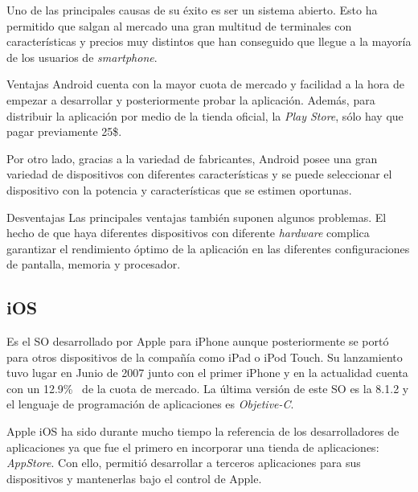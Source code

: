 Uno de las principales causas de su éxito es ser un sistema abierto. Esto ha permitido que salgan al
mercado una gran multitud de terminales con características y precios muy distintos que han
conseguido que llegue a la mayoría de los usuarios de \emph{smartphone}.

\begin{definitionlist}
  \item[Ventajas] Android cuenta con la mayor cuota de mercado y facilidad a la hora de empezar a
    desarrollar y posteriormente probar la aplicación. Además, para distribuir la aplicación por
    medio de la tienda oficial, la \emph{Play Store}, sólo hay que pagar previamente 25\$.

    Por otro lado, gracias a la variedad de fabricantes, Android posee una gran variedad de
    dispositivos con diferentes características y se puede seleccionar el dispositivo con la
    potencia y características que se estimen oportunas.

  \item[Desventajas] Las principales ventajas también suponen algunos problemas. El hecho de que
    haya diferentes dispositivos con diferente \emph{hardware} complica garantizar el rendimiento
    óptimo de la aplicación en las diferentes configuraciones de pantalla, memoria y procesador.

\end{definitionlist}

\subsection{iOS}

Es el \acs{SO} desarrollado por Apple para iPhone aunque posteriormente se portó para otros
dispositivos de la compañía como iPad o iPod Touch. Su lanzamiento tuvo lugar en Junio de 2007 junto
con el primer iPhone y en la actualidad cuenta con un 12.9\%~\cite{Llamas13} de la cuota de
mercado. La última versión de este \acs{SO} es la 8.1.2 y el lenguaje de programación de
aplicaciones es \emph{Objetive-C}.

Apple iOS ha sido durante mucho tiempo la referencia de los desarrolladores de aplicaciones ya que
fue el primero en incorporar una tienda de aplicaciones: \emph{AppStore}. Con ello, permitió
desarrollar a terceros aplicaciones para sus dispositivos y mantenerlas bajo el control de Apple.

